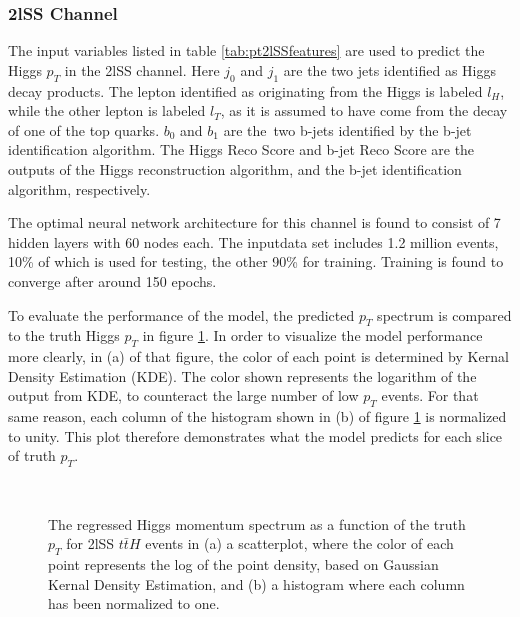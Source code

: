 \subsubsection{2lSS Channel}
\label{subsec:pt2lSS}                                                                                                      

The input variables listed in table \ref{tab:pt2lSSfeatures} are used to predict the Higgs $p_T$ in the 2lSS channel. Here $j_0$ and $j_1$ are the two jets identified as Higgs decay products. The lepton identified as originating from the Higgs is labeled $l_H$, while the other lepton is labeled $l_T$, as it is assumed to have come from the decay of one of the top quarks. $b_0$ and $b_1$ are the\ two b-jets identified by the b-jet identification algorithm. The Higgs Reco Score and b-jet Reco Score are the outputs of the Higgs reconstruction algorithm, and the b-jet identification algorithm, respectively.



The optimal neural network architecture for this channel is found to consist of 7 hidden layers with 60 nodes each. The inputdata set includes 1.2 million events, 10\% of which is used for testing, the other 90\% for training. Training is found to converge after around 150 epochs. 

To evaluate the performance of the model, the predicted $p_T$ spectrum is compared to the truth Higgs $p_T$ in figure \ref{fig:pt2lSSresults}. In  order to visualize the model performance more clearly, in (a) of that figure, the color of each point is determined by Kernal Density Estimation (KDE). The color shown represents the logarithm of the output from KDE, to counteract the large number of low $p_T$ events. For that same reason, each column of the histogram shown in (b) of figure \ref{fig:pt2lSSresults} is normalized to unity. This plot therefore demonstrates what the model predicts for each slice of truth $p_T$.

\begin{figure}[h!]
    \\
    \caption{The regressed Higgs momentum spectrum as a function of the truth $p_T$ for 2lSS $t\bar{t}H$ events in (a) a scatterplot, where the color of each point represents the log of the point density, based on Gaussian Kernal Density Estimation, and (b) a histogram where each column  has been normalized to one.}
    \label{fig:pt2lSSresults}
\end{figure}

